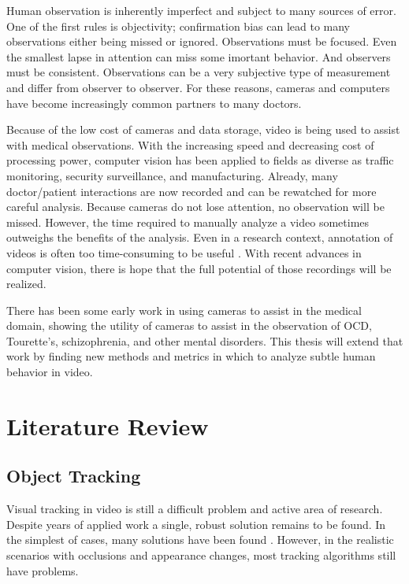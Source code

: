 \documentclass[11pt]{article}
\newcounter{list}
\begin{document}
Human observation is inherently imperfect and subject to many sources of error. One of the first rules  is objectivity; confirmation bias can lead to many observations either being missed or ignored. Observations must be focused. Even the smallest lapse in attention can miss some imortant behavior. And observers must be consistent. Observations can be a very subjective type of measurement and differ from observer to observer. For these reasons, cameras and computers have become increasingly common partners to many doctors.

Because of the low cost of cameras and data storage, video is being used to assist with medical observations. With the increasing speed and decreasing cost of processing power, computer vision has been applied to fields as diverse as traffic monitoring\cite{Gupte}, security surveillance\cite{bird2006}, and manufacturing\cite{saurez2018}. Already, many doctor/patient interactions are now recorded and can be rewatched for more careful analysis. Because cameras do not lose attention, no observation will be missed. However, the time required to manually analyze a video sometimes outweighs the benefits of the analysis. Even in a research context, annotation of videos is often too time-consuming to be useful\cite{fasching2016} \cite{walkup1992}. With recent advances in computer vision, there is hope that the full potential of those recordings will be realized.

There has been some early work in using cameras to assist in the medical domain, showing the utility of cameras to assist in the observation of OCD, Tourette's, schizophrenia, and other mental disorders. This thesis will extend that work by finding new methods and metrics in which to analyze subtle human behavior in video.

\section{Literature Review}
\subsection{Object Tracking}
Visual tracking in video is still a difficult problem and active area of research. Despite years of applied work a single, robust solution remains to be found. In the simplest of cases, many solutions have been found\cite{comaniciu2002} \cite{bradski98}. However, in the realistic scenarios with occlusions and appearance changes, most tracking algorithms still have problems.
\end{document}
